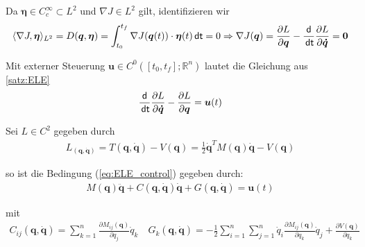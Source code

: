 \documentclass[a4paper, 12pt]{scrartcl}
\newcommand{\dt}{\thinspace \mathsf{dt}}
\begin{document}
\begin{beweis}
    Da $\bm{\eta} \in C^{\infty}_c \subset L^{2}$ und $\nabla J \in L^2$ gilt, identifizieren
    wir
    \begin{align*}
        \langle \nabla J, \bm{\eta} \rangle_{L^2} 
        =
        D(\bm{q}, \bm{\eta})
        =
        \int_{t_0}^{t_f} \nabla J(\bm{q}(t)) \cdot \bm{\eta}(t) \dt
        = 0
        \Rightarrow
        \nabla J(\bm{q}) = 
        \frac{\partial L}{\partial \bm{q}} 
        -
        \frac{\mathsf{d}}{\dt} \frac{\partial L}{\partial \bm{\dot{q}}}
        =
        \bm{0} 
    \end{align*}

\end{beweis}

Mit externer Steuerung
$\bm{u} \in C^0([t_0,t_f]; \mathbb{R}^n)$ lautet die Gleichung aus \ref{satz:ELE}
%
\begin{align}\label{eq:ELE_control}
    \frac{\mathsf{d}}{\dt}
    \frac{\partial L}{\partial \bm{\dot{q}}}
    -
    \frac{\partial L}{\partial \bm{q}}
    =
    \bm{u}(t)
\end{align}

\begin{satz}\label{satz:ELE_2nd_Order}
   Sei $L\in C^2$ gegeben durch 
    \begin{align*}
        L_(\bm{q}, \bm{\dot{q}})
        =
        T(\bm{q}, \bm{\dot{q}})
        -
        V(\bm{q})
        =
        \frac{1}{2} \bm{\dot{q}}^T M(\bm{q}) \bm{\dot{q}} 
        -
        V(\bm{q})
    \end{align*}

    so ist die Bedingung (\ref{eq:ELE_control}) gegeben durch: 
    \begin{align*}
        M(\bm{q}) \bm{\ddot{q}} 
        + 
        C(\bm{q},\bm{\dot{q}}) \bm{\dot{q}} 
        + 
        G(\bm{q},\bm{\dot{q}})
        = 
        \bm{u}(t)
    \end{align*}

    mit 
    \begin{align*}
        C_{ij}(\bm{q},\bm{\dot{q}})
        =
        \sum_{k=1}^{n} \frac{\partial M_{ij}(\bm{q})}{\partial q_j} \dot{q}_k
        \quad
        G_{k}(\bm{q}, \bm{\dot{q}})
        =
        -
        \frac{1}{2} 
        \sum_{i=1}^{n}
            \sum_{j=1}^{n}
                \dot{q}_i 
                \frac{\partial M_{ij}(\bm{q})}{\partial q_k}
                \dot{q}_j 
        +
        \frac{\partial V(\bm{q})}{\partial q_k}
    \end{align*}
\end{satz}
\end{document}
